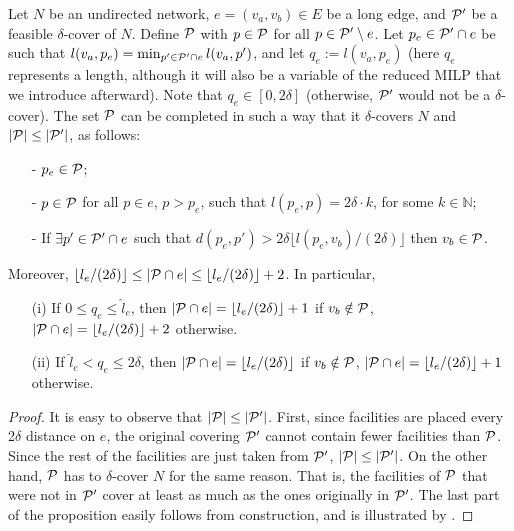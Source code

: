 \begin{proposition}\label{prop:broken-valid}
Let $N$ be an undirected network, $e=(v_a,v_b)\in E$ be a long edge, and $\mathcal P '$ be a feasible $\delta$-cover of $N$. Define $\mathcal P$ with $p\in \mathcal P$ for all $p\in \mathcal P ' \setminus e$.  Let $p_e\in \mathcal P '\cap e$ be such that $l(v_a,p_e)=\min_{p'\in \mathcal P '\cap e} l(v_a,p')$, and let $q_e:=l(v_a,p_e)$ (here $q_e$ represents a length, although it will also be a variable of the reduced MILP that we introduce afterward). Note that $q_e\in[0,2\delta]$ (otherwise, $\mathcal P '$ would not be a $\delta$-cover). The set $\mathcal P$ can be completed in such a way that it $\delta$-covers $N$ and $|\mathcal P|\leq | \mathcal P '|$, as follows:
\begin{itemize}
	\item[-] $p_e\in \mathcal P$;
	\item[-] $p\in \mathcal P$ for all $p\in e$, $p>p_e$, such that $l(p_e,p)=2\delta\cdot k$, for some $k\in \mathbb{N}$;
	\item[-] If $\exists p'\in \mathcal P '\cap e$ such that $d(p_e,p')>2\delta\lfloor l(p_e,v_b)/(2\delta) \rfloor$ then $v_b\in \mathcal P $.
\end{itemize}
Moreover, $ \lfloor l_e/(2\delta) \rfloor\leq |\mathcal P \cap e|\leq \lfloor l_e/(2\delta) \rfloor +2$. In particular,
\begin{enumerate}
	\item[(i)] If $0\leq q_e\leq \hat{l}_e$, then  $|\mathcal P \cap e|= \lfloor l_e/(2\delta) \rfloor+1$ if $v_b \notin \mathcal P$,  $|\mathcal P \cap e|= \lfloor l_e/(2\delta) \rfloor+2$ otherwise.
	\item[(ii)] If $\hat{l}_e <q_e\leq 2\delta$, then  $|\mathcal P \cap e|= \lfloor l_e/(2\delta) \rfloor$ if $v_b \notin \mathcal P$,  $|\mathcal P \cap e|= \lfloor l_e/(2\delta) \rfloor+1$ otherwise.
\end{enumerate}
\end{proposition}
\begin{proof}
It is easy to observe that $|\mathcal P|\leq | \mathcal P '|$. First,  since facilities are placed every 2$\delta$ distance on $e$, the original covering $\mathcal P '$ cannot contain fewer facilities than $\mathcal P$. Since the rest of the facilities are just taken from $\mathcal P'$, $|\mathcal P|\leq |\mathcal P '|$. On the other hand, $\mathcal P$ has to $\delta$-cover $N$ for the same reason. That is, the facilities of $\mathcal P$ that were not in $\mathcal P '$ cover at least as much as the ones originally in $\mathcal P'$. The last part of the proposition easily follows from construction, and is illustrated by .
\end{proof}

